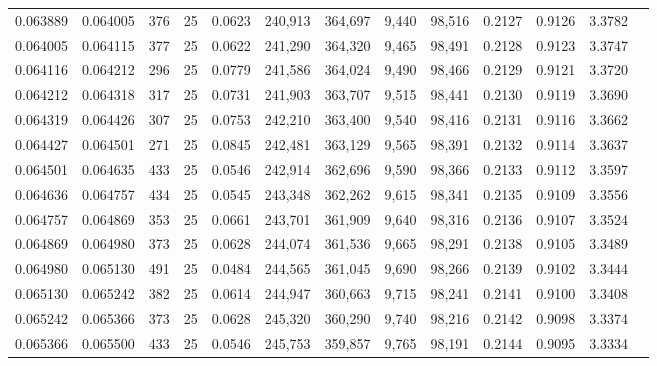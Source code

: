\begin{tabular}{rrrrrrrrrrrrr}
0.063889 & 0.064005 &   376 &  25 &                                     0.0623 & 240,913 & 364,697 &   9,440 &  98,516 & 0.2127 & 0.9126 & 3.3782 \\
0.064005 & 0.064115 &   377 &  25 &                                     0.0622 & 241,290 & 364,320 &   9,465 &  98,491 & 0.2128 & 0.9123 & 3.3747 \\
0.064116 & 0.064212 &   296 &  25 &                                     0.0779 & 241,586 & 364,024 &   9,490 &  98,466 & 0.2129 & 0.9121 & 3.3720 \\
0.064212 & 0.064318 &   317 &  25 &                                     0.0731 & 241,903 & 363,707 &   9,515 &  98,441 & 0.2130 & 0.9119 & 3.3690 \\
0.064319 & 0.064426 &   307 &  25 &                                     0.0753 & 242,210 & 363,400 &   9,540 &  98,416 & 0.2131 & 0.9116 & 3.3662 \\
0.064427 & 0.064501 &   271 &  25 &                                     0.0845 & 242,481 & 363,129 &   9,565 &  98,391 & 0.2132 & 0.9114 & 3.3637 \\
0.064501 & 0.064635 &   433 &  25 &                                     0.0546 & 242,914 & 362,696 &   9,590 &  98,366 & 0.2133 & 0.9112 & 3.3597 \\
0.064636 & 0.064757 &   434 &  25 &                                     0.0545 & 243,348 & 362,262 &   9,615 &  98,341 & 0.2135 & 0.9109 & 3.3556 \\
0.064757 & 0.064869 &   353 &  25 &                                     0.0661 & 243,701 & 361,909 &   9,640 &  98,316 & 0.2136 & 0.9107 & 3.3524 \\
0.064869 & 0.064980 &   373 &  25 &                                     0.0628 & 244,074 & 361,536 &   9,665 &  98,291 & 0.2138 & 0.9105 & 3.3489 \\
0.064980 & 0.065130 &   491 &  25 &                                     0.0484 & 244,565 & 361,045 &   9,690 &  98,266 & 0.2139 & 0.9102 & 3.3444 \\
0.065130 & 0.065242 &   382 &  25 &                                     0.0614 & 244,947 & 360,663 &   9,715 &  98,241 & 0.2141 & 0.9100 & 3.3408 \\
0.065242 & 0.065366 &   373 &  25 &                                     0.0628 & 245,320 & 360,290 &   9,740 &  98,216 & 0.2142 & 0.9098 & 3.3374 \\
0.065366 & 0.065500 &   433 &  25 &                                     0.0546 & 245,753 & 359,857 &   9,765 &  98,191 & 0.2144 & 0.9095 & 3.3334 \\

\end{tabular}
